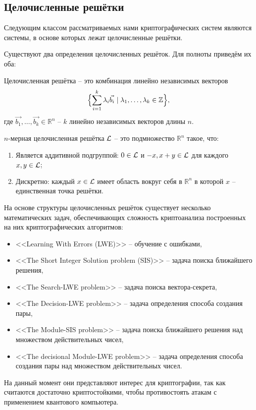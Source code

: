 \subsection{Целочисленные решётки}
Следующим классом рассматриваемых нами криптографических систем являются системы, в основе которых лежат целочисленные решётки.

Существуют два определения целочисленных решёток. Для полноты приведём их оба:

\begin{definition}
Целочисленная решётка -- это комбинация линейно независимых векторов
\begin{equation}
    \Bigl\{ \sum_{i=1}^{k}\lambda_i \vec{b_i} \mid \lambda_1, \ldots , \lambda_k \in \mathbb{Z} \Bigr\},
\end{equation}
где $\vec{b_1},\ldots,\vec{b_k} \in \mathbb{R}^n$ -- $k$ линейно независимых векторов длины $n$.
\end{definition}

\begin{definition}
$n$-мерная целочисленная решётка $\cal L$ -- это подмножество $\mathbb{R}^n$ такое, что:
\begin{enumerate}
    \item Является аддитивной подгруппой: $0 \in \cal L$ и $-x,x+y \in \cal L$ для каждого $x, y \in \cal L$;
    \item Дискретно: каждый $x \in \cal L$ имеет область вокруг себя в $\mathbb{R}^n$ в которой $x$ -- единственная точка решётки.
\end{enumerate}
\end{definition}

На основе структуры целочисленных решёток существует несколько математических задач, обеспечивающих сложность криптоанализа построенных на них криптографических алгоритмов\cite{lattice_problems}:
\begin{itemize}
    \item <<Learning With Errors (LWE)>> -- обучение с ошибками,
    \item <<The Short Integer Solution problem (SIS)>> -- задача поиска ближайшего решения,
    \item <<The Search-LWE problem>> -- задача поиска вектора-секрета,
    \item <<The Decision-LWE problem>> -- задача определения способа создания пары,
    \item <<The Module-SIS problem>> -- задача поиска ближайшего решения над множеством действительных чисел,
    \item <<The decisional Module-LWE problem>> -- задача определения способа создания пары над множеством действительных чисел.
\end{itemize}
На данный момент они представляют интерес для криптографии, так как считаются достаточно криптостойкими\cite{Kyber-DOC}, чтобы противостоять атакам с применением квантового компьютера.

